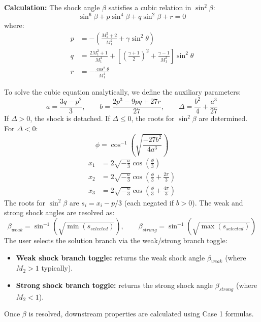 \textbf{Calculation:} The shock angle $\beta$ satisfies a cubic relation in $\sin^2\beta$:
\begin{equation}
\sin^6\beta + p\sin^4\beta + q\sin^2\beta + r = 0
\end{equation}
where:
\begin{align}
p &= -\left(\frac{M_1^2+2}{M_1^2}+\gamma\sin^2\theta\right) \\
q &= \frac{2M_1^2+1}{M_1^4}+\left[\left(\frac{\gamma+1}{2}\right)^2+\frac{\gamma-1}{M_1^2}\right]\sin^2\theta \\
r &= -\frac{\cos^2\theta}{M_1^4}
\end{align}

To solve the cubic equation analytically, we define the auxiliary parameters:
\begin{equation}
a = \frac{3q-p^2}{3}, \qquad b = \frac{2p^3-9pq+27r}{27}, \qquad \Delta = \frac{b^2}{4}+\frac{a^3}{27}
\end{equation}
If $\Delta > 0$, the shock is detached. If $\Delta \le 0$, the roots for $\sin^2\beta$ are determined. For $\Delta < 0$:
\begin{equation}
\phi = \cos^{-1}\left(\sqrt{\frac{-27b^2}{4a^3}}\right)
\end{equation}
\begin{align}
x_1 &= 2\sqrt{-\frac{a}{3}}\cos\left(\frac{\phi}{3}\right) \\
x_2 &= 2\sqrt{-\frac{a}{3}}\cos\left(\frac{\phi}{3}+\frac{2\pi}{3}\right) \\
x_3 &= 2\sqrt{-\frac{a}{3}}\cos\left(\frac{\phi}{3}+\frac{4\pi}{3}\right)
\end{align}
The roots for $\sin^2\beta$ are $s_i = x_i - p/3$ (each negated if $b > 0$). The weak and strong shock angles are resolved as:
\begin{equation}
\beta_{weak} = \sin^{-1}(\sqrt{\min(s_{selected})}), \qquad \beta_{strong} = \sin^{-1}(\sqrt{\max(s_{selected})})
\end{equation}
The user selects the solution branch via the weak/strong branch toggle:
\begin{itemize}[nosep]
    \item \textbf{Weak shock branch toggle:} returns the weak shock angle $\beta_{weak}$ (where $M_2 > 1$ typically).
    \item \textbf{Strong shock branch toggle:} returns the strong shock angle $\beta_{strong}$ (where $M_2 < 1$).
\end{itemize}
Once $\beta$ is resolved, downstream properties are calculated using Case 1 formulas.



